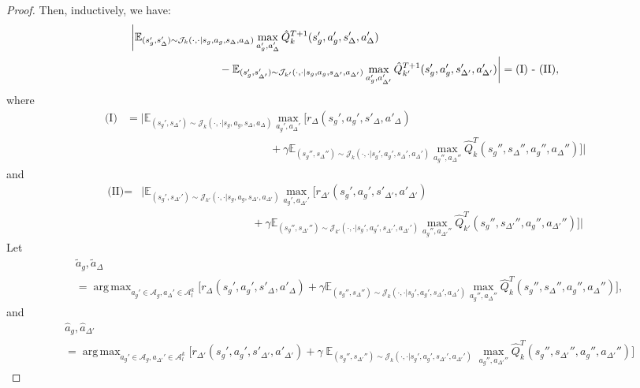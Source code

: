 \documentclass{article}
\theoremstyle{plain}
\theoremstyle{definition}
\def\E{\mathbb{E}}
\DeclareMathOperator*{\argmax}{arg\,max}
\begin{document}
\begin{proof}
Then, inductively, we have:
\begin{align*}
&\bigg|\E_{(s_g',s_\Delta')\sim{\mathcal{J}_k(\cdot,\cdot|s_g,a_g,s_\Delta,a_\Delta)}} \max_{a_g',a_\Delta'}\hat{Q}_k^{T+1}(s'_g,a_g',s_\Delta',a_\Delta') \\ 
&\quad\quad\quad \quad\quad \quad\quad \quad -\E_{(s_g',s_{\Delta'}')\sim{\mathcal{J}_{k'}(\cdot,\cdot|s_g,a_g,s_{\Delta'},a_{\Delta'})}}\max_{a_g',a'_{\Delta'}}\hat{Q}_{k'}^{T+1}(s'_g, a_g',s'_{\Delta'}, a'_{\Delta'})\bigg| = \text{(I) - \text{(II)}},
\end{align*}
where
\begin{align*}\text{(I)} &= \bigg|\E_{(s_g',s_\Delta')\sim{\mathcal{J}_k(\cdot,\cdot|s_g,a_g,s_\Delta,a_\Delta)}} \max_{a_g',a_\Delta'}\bigg[r_{\Delta}(s_g',a_g',s'_{\Delta}, a'_{\Delta})\\
&\quad\quad\quad\quad\quad \quad\quad\quad\quad\quad\quad\quad\quad+\gamma\E_{(s_g'',s_\Delta'')\sim\mathcal{J}_{k}(\cdot,\cdot|s_g',a_g',s_\Delta',a_\Delta')} \max_{a_g'',a_\Delta''}\hat{Q}_k^T(s_g'',s_\Delta'',a_g'',a_\Delta'')\bigg]\bigg|
\end{align*}
and
\begin{align*}
\text{(II)} = &\bigg|\E_{(s_g',s_{\Delta'}')\sim{\mathcal{J}_{k'}(\cdot,\cdot|s_g,a_g,s_{\Delta'},a_{\Delta'})}} \max_{a_g',a_{\Delta'}'}\bigg[r_{\Delta'}(s_g',a_g',s'_{\Delta'}, a'_{\Delta'})\\
&\quad\quad\quad\quad\quad\quad\quad\quad\quad\quad+\gamma\E_{(s_g'',s_{\Delta'}'')\sim\mathcal{J}_{k'}(\cdot,\cdot|s_g',a_g',s_{\Delta'}',a_{\Delta'}')} \max_{a_g'',a_{\Delta'}''}\hat{Q}_{k'}^T(s_g'',s_{\Delta'}'',a_g'',a_{\Delta'}'')\bigg]\bigg|
\end{align*}
Let
\begin{align*}&\tilde{a}_g,\tilde{a}_\Delta\\ &=\mathop{\argmax}_{a_g'\in\mathcal{A}_g, a_\Delta'\in\mathcal{A}_l^k} \bigg[r_{\Delta}(s_g',a_g',s'_{\Delta}, a'_{\Delta})+\gamma\E_{(s_g'',s_\Delta'')\sim\mathcal{J}_{k}(\cdot,\cdot|s_g',a_g',s_\Delta',a_\Delta')} \max_{a_g'',a_\Delta''}\hat{Q}_k^T(s_g'',s_\Delta'',a_g'',a_\Delta'')\bigg],\end{align*}
and
\begin{align*}&\hat{a}_g,\hat{a}_{\Delta'}\\
&=\mathop{\argmax}_{a_g'\in\mathcal{A}_g, a_{\Delta'}'\in\mathcal{A}_l^k} \bigg[r_{\Delta'}(s_g',a_g',s'_{\Delta'}, a'_{\Delta'})\!+\!\gamma\mathop{\E}_{(s_g'',s_{\Delta'}'')\sim\mathcal{J}_{k}(\cdot,\cdot|s_g',a_g',s_{\Delta'}',a_{\Delta'}')} \max_{a_g'',a_{\Delta'}''}\hat{Q}_k^T(s_g'',s_{\Delta'}'',a_g'',a_{\Delta'}'')\bigg]\end{align*}

\end{proof}
\end{document}

